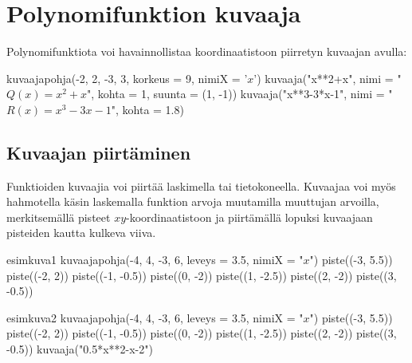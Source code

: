 \section{Polynomifunktion kuvaaja}
Polynomifunktiota voi
havainnollistaa koordinaatistoon piirretyn kuvaajan avulla:



\begin{kuva}
kuvaajapohja(-2, 2, -3, 3, korkeus = 9, nimiX = '$x$')
kuvaaja("x**2+x", nimi = "$Q(x) = x^2+x$", kohta = 1, suunta = (1, -1))
kuvaaja("x**3-3*x-1", nimi = "$R(x) = x^3-3x-1$", kohta = 1.8)
\end{kuva}

\subsection*{Kuvaajan piirtäminen}


Funktioiden kuvaajia voi piirtää laskimella tai tietokoneella. Kuvaajaa voi myös hahmotella käsin laskemalla funktion arvoja muutamilla muuttujan arvoilla, merkitsemällä pisteet
$xy$-koordinaatistoon ja piirtämällä lopuksi kuvaajaan pisteiden kautta kulkeva viiva.

\begin{luoKuva}{esimkuva1}
kuvaajapohja(-4, 4, -3, 6, leveys = 3.5, nimiX = "$x$")
piste((-3, 5.5))
piste((-2, 2))
piste((-1, -0.5))
piste((0, -2))
piste((1, -2.5))
piste((2, -2))
piste((3, -0.5))
\end{luoKuva}
\begin{luoKuva}{esimkuva2}
kuvaajapohja(-4, 4, -3, 6, leveys = 3.5, nimiX = "$x$")
piste((-3, 5.5))
piste((-2, 2))
piste((-1, -0.5))
piste((0, -2))
piste((1, -2.5))
piste((2, -2))
piste((3, -0.5))
kuvaaja("0.5*x**2-x-2")
\end{luoKuva}

